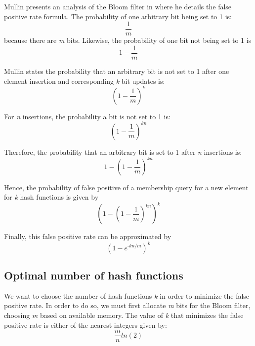Mullin presents an analysis of the Bloom filter in \cite{Mullin-Bloom-Analysis} where he details the false positive rate formula. The probability of one arbitrary bit being set to 1 is:
\begin{equation}
    \frac{1}{m}
\end{equation}
because there are \textit{m} bits. Likewise, the probability of one bit not being set to 1 is
\begin{equation}
    1-\frac{1}{m}
\end{equation}

Mullin states the probability that an arbitrary bit is not set to 1 after one element insertion and corresponding \textit{k} bit updates is:
\begin{equation}
    (1-\frac{1}{m})^\textit{k}
\end{equation}

For \textit{n} insertions, the probability a bit is not set to 1 is:
\begin{equation}
    (1-\frac{1}{m})^\textit{kn}
\end{equation}

Therefore, the probability that an arbitrary bit is set to 1 after \textit{n} insertions is:
\begin{equation}
    1-(1-\frac{1}{m})^\textit{kn}
\end{equation}

Hence, the probability of false positive of a membership query for a new element for \textit{k} hash functions is given by
\begin{equation}
    (1-(1-\frac{1}{m})^\textit{kn})^\textit{k}
\end{equation}

Finally, this false positive rate can be approximated by 
\begin{equation}
    (1-e^\textit{-kn/m})^\textit{k}
\end{equation}


\subsection*{Optimal number of hash functions}
We want to choose the number of hash functions \textit{k} in order to minimize the false positive rate. In order to do so, we must first allocate \textit{m} bits for the Bloom filter, choosing \textit{m} based on available memory. The value of \textit{k} that minimizes the false positive rate is either of the nearest integers given by:
\begin{equation}
    \frac{m}{n}ln(2)
\end{equation}


